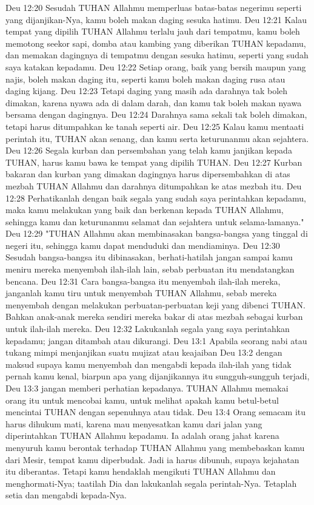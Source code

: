 Deu 12:20  Sesudah TUHAN Allahmu memperluas batas-batas negerimu seperti yang dijanjikan-Nya, kamu boleh makan daging sesuka hatimu.
Deu 12:21  Kalau tempat yang dipilih TUHAN Allahmu terlalu jauh dari tempatmu, kamu boleh memotong seekor sapi, domba atau kambing yang diberikan TUHAN kepadamu, dan memakan dagingnya di tempatmu dengan sesuka hatimu, seperti yang sudah saya katakan kepadamu.
Deu 12:22  Setiap orang, baik yang bersih maupun yang najis, boleh makan daging itu, seperti kamu boleh makan daging rusa atau daging kijang.
Deu 12:23  Tetapi daging yang masih ada darahnya tak boleh dimakan, karena nyawa ada di dalam darah, dan kamu tak boleh makan nyawa bersama dengan dagingnya.
Deu 12:24  Darahnya sama sekali tak boleh dimakan, tetapi harus ditumpahkan ke tanah seperti air.
Deu 12:25  Kalau kamu mentaati perintah itu, TUHAN akan senang, dan kamu serta keturunanmu akan sejahtera.
Deu 12:26  Segala kurban dan persembahan yang telah kamu janjikan kepada TUHAN, harus kamu bawa ke tempat yang dipilih TUHAN.
Deu 12:27  Kurban bakaran dan kurban yang dimakan dagingnya harus dipersembahkan di atas mezbah TUHAN Allahmu dan darahnya ditumpahkan ke atas mezbah itu.
Deu 12:28  Perhatikanlah dengan baik segala yang sudah saya perintahkan kepadamu, maka kamu melakukan yang baik dan berkenan kepada TUHAN Allahmu, sehingga kamu dan keturunanmu selamat dan sejahtera untuk selama-lamanya."
Deu 12:29  "TUHAN Allahmu akan membinasakan bangsa-bangsa yang tinggal di negeri itu, sehingga kamu dapat menduduki dan mendiaminya.
Deu 12:30  Sesudah bangsa-bangsa itu dibinasakan, berhati-hatilah jangan sampai kamu meniru mereka menyembah ilah-ilah lain, sebab perbuatan itu mendatangkan bencana.
Deu 12:31  Cara bangsa-bangsa itu menyembah ilah-ilah mereka, janganlah kamu tiru untuk menyembah TUHAN Allahmu, sebab mereka menyembah dengan melakukan perbuatan-perbuatan keji yang dibenci TUHAN. Bahkan anak-anak mereka sendiri mereka bakar di atas mezbah sebagai kurban untuk ilah-ilah mereka.
Deu 12:32  Lakukanlah segala yang saya perintahkan kepadamu; jangan ditambah atau dikurangi.
Deu 13:1  Apabila seorang nabi atau tukang mimpi menjanjikan suatu mujizat atau keajaiban
Deu 13:2  dengan maksud supaya kamu menyembah dan mengabdi kepada ilah-ilah yang tidak pernah kamu kenal, biarpun apa yang dijanjikannya itu sungguh-sungguh terjadi,
Deu 13:3  jangan memberi perhatian kepadanya. TUHAN Allahmu memakai orang itu untuk mencobai kamu, untuk melihat apakah kamu betul-betul mencintai TUHAN dengan sepenuhnya atau tidak.
Deu 13:4  Orang semacam itu harus dihukum mati, karena mau menyesatkan kamu dari jalan yang diperintahkan TUHAN Allahmu kepadamu. Ia adalah orang jahat karena menyuruh kamu berontak terhadap TUHAN Allahmu yang membebaskan kamu dari Mesir, tempat kamu diperbudak. Jadi ia harus dibunuh, supaya kejahatan itu diberantas. Tetapi kamu hendaklah mengikuti TUHAN Allahmu dan menghormati-Nya; taatilah Dia dan lakukanlah segala perintah-Nya. Tetaplah setia dan mengabdi kepada-Nya.
